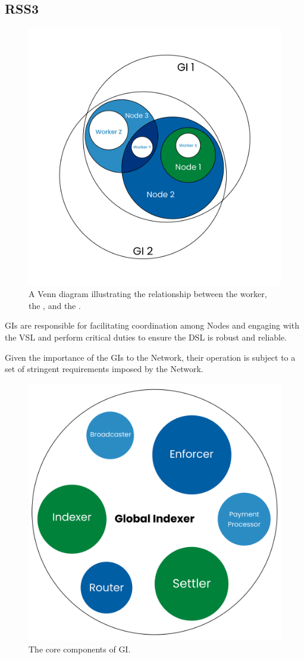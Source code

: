 \subsection{RSS3 }
\label{subsec:GI}

{
    \begin{figure}[tb!]
        \centering
        \includegraphics[width=0.7\columnwidth]{figures/GI.png}
        \caption{A Venn diagram illustrating the relationship between the worker, the , and the .}
        \label{fig:GI}
    \end{figure}
}

\glspl{GI} are responsible for facilitating coordination among \glspl{Node} and engaging with the \gls{VSL} and perform critical duties to ensure the \gls{DSL} is robust and reliable.

Given the importance of the \glspl{GI} to the Network, their operation is subject to a set of stringent requirements imposed by the Network.

{
    \begin{figure}[tb!]
        \centering
        \includegraphics[width=0.7\columnwidth]{figures/GI-components.png}
        \caption{The core components of \gls{GI}.}
        \label{fig:GI-components}
    \end{figure}
}

